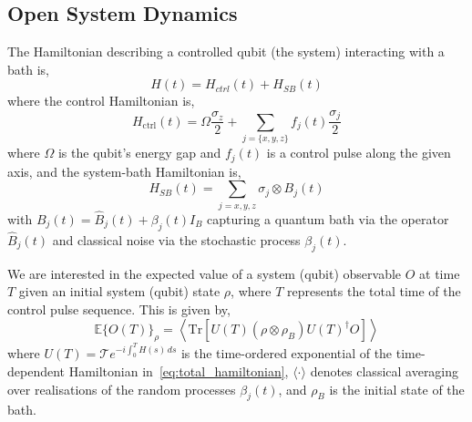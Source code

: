 \documentclass[12pt]{iopart}
\begin{document}
\subsection{Open System Dynamics \label{subsec:separating_control_dynamics_from_system_environment_interaction_dynamics}}
The Hamiltonian describing a controlled qubit (the system) interacting with a bath is,
\begin{equation}
    \label{eq:total_hamiltonian}
 H(t) = H_{ctrl}(t) + H_{SB}(t)
\end{equation}
where the control Hamiltonian is,
\begin{equation}
    \label{eq:control_hamiltonian}
 H_{\mathrm{ctrl}}(t)=\Omega \frac{\sigma_{z}}{2}+\sum_{j=\{x, y, z\}} f_{j}(t) \frac{\sigma_{j}}{2}
\end{equation}
where $\Omega$ is the qubit's energy gap and $f_j(t)$ is a control pulse along the given axis, and the system-bath Hamiltonian is,
\begin{equation}
    \label{eq:system_bath_hamiltonian}
 H_{SB}(t) = \sum_{j=x, y, z} \sigma_{j} \otimes B_{j}(t)
\end{equation}
with $B_{j}(t)=\hat{B}_{j}(t)+\beta_{j}(t) I_{B}$ capturing a quantum bath via the operator $\hat{B}_{j}(t)$ and classical noise via the stochastic process $\beta_{j}(t)$.

We are interested in the expected value of a system (qubit) observable $O$ at time $T$ given an initial system (qubit) state $\rho$, where $T$ represents the total time of the control pulse sequence. This is given by,
\begin{equation} \label{eq:initial_expectation}
 \mathbb{E}\{O(T)\}_{\rho}=\left\langle\mathrm{Tr}\left[U(T)\left(\rho \otimes \rho_{B}\right) U(T)^{\dagger} O\right]\right\rangle
\end{equation}
where $U(T)=\mathcal{T} e^{-i \int_{0}^{T} H(s) \, ds}$ is the time-ordered exponential of the time-dependent Hamiltonian in~\cref{eq:total_hamiltonian}, $\langle\cdot\rangle$ denotes classical averaging over realisations of the random processes $\beta_{j}(t)$, and $\rho_{B}$ is the initial state of the bath.
\end{document}
